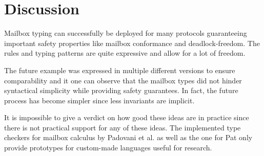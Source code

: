 
\section{Discussion}
\label{sec:discussion}

Mailbox typing can successfully be deployed for many protocols guaranteeing important safety properties like mailbox conformance and deadlock-freedom. The rules and typing patterns are quite expressive and allow for a lot of freedom. 

The future example was expressed in multiple different versions to ensure comparability and it one can observe that the mailbox types did not hinder syntactical simplicity while providing safety guarantees. In fact, the future process has become simpler since less invariants are implicit.

It is impossible to give a verdict on how good these ideas are in practice since there is not practical support for any of these ideas. The implemented type checkers for mailbox calculus by Padovani et al.\cite{padovaniBoystrangeMCC2024} as well as the one for Pat\cite{fowlerPatCheckerGithub2025} only provide prototypes for custom-made languages useful for research. 

